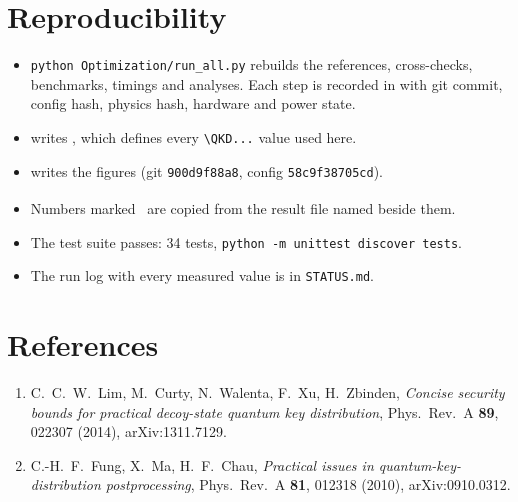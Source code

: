\documentclass[11pt,a4paper]{article}
\newcommand{\typed}{\textsuperscript{\dag}}
\begin{document}
\section{Reproducibility}
\sloppy
\begin{itemize}
\item \texttt{python Optimization/run\_all.py} rebuilds the references, cross-checks, benchmarks, timings and
  analyses. Each step is recorded in  with git commit, config hash, physics hash,
  hardware and power state.
\item {} writes , which defines every
  \verb|\QKD...| value used here.
\item {} writes the figures (git \texttt{900d9f88a8}, config
  \texttt{58c9f38705cd}).
\item Numbers marked \typed\ are copied from the result file named beside them.
\item The test suite passes: 34 tests, \texttt{python -m unittest discover tests}.
\item The run log with every measured value is in \texttt{STATUS.md}.
\end{itemize}

\section*{References}
\begin{enumerate}\small
\item C.~C.~W.~Lim, M.~Curty, N.~Walenta, F.~Xu, H.~Zbinden, \emph{Concise security bounds for practical
  decoy-state quantum key distribution}, Phys.\ Rev.\ A \textbf{89}, 022307 (2014), arXiv:1311.7129.
\item C.-H.~F.~Fung, X.~Ma, H.~F.~Chau, \emph{Practical issues in quantum-key-distribution postprocessing},
  Phys.\ Rev.\ A \textbf{81}, 012318 (2010), arXiv:0910.0312.
\end{enumerate}
\end{document}
